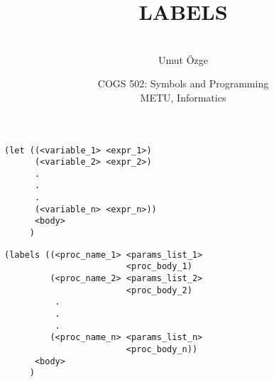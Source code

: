 \documentclass[ignorenonframetext,10pt,aspectratio=169]{beamer}
\title{LABELS}
\author{\  \\ \vspace{20pt} Umut \"Ozge\\  }
\date{COGS 502: Symbols and Programming \\ METU, Informatics}
\begin{document}
\begin{frame}\frametitle{}
\thispagestyle{empty}
\maketitle
\end{frame}

\begin{frame}{}

\begin{ucodeframe}
\begin{Verbatim}
(let ((<variable_1> <expr_1>)
      (<variable_2> <expr_2>)
	  .  
	  .
	  .
      (<variable_n> <expr_n>))
      <body>
     )
\end{Verbatim}
\end{ucodeframe}

\end{frame}

\begin{frame}{}

\begin{ucodeframe}
\begin{Verbatim}
(labels ((<proc_name_1> <params_list_1>
                        <proc_body_1)
         (<proc_name_2> <params_list_2>
                        <proc_body_2) 
          .
          .
          .
         (<proc_name_n> <params_list_n>
                        <proc_body_n))
      <body>
     )
\end{Verbatim}
\end{ucodeframe}

\end{frame}
\begin{frame}[t,plain]{}


\end{frame}

\begin{frame}[t,plain]{}


\end{frame}

\begin{frame}[t,plain]{}


\end{frame}

\begin{frame}[t,plain]{}


\end{frame}
\end{document}
